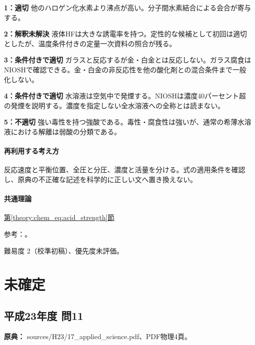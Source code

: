 \noindent\textbf{1：適切} 他のハロゲン化水素より沸点が高い。分子間水素結合による会合が寄与する。\par

\noindent\textbf{2：解釈未解決} 液体HFは大きな誘電率を持つ。定性的な候補として初回は適切としたが、温度条件付きの定量一次資料の照合が残る。\par

\noindent\textbf{3：条件付きで適切} ガラスと反応するが金・白金とは反応しない。ガラス腐食はNIOSHで確認できる。金・白金の非反応性を他の酸化剤との混合条件まで一般化しない。\par

\noindent\textbf{4：条件付きで適切} 水溶液は空気中で発煙する。NIOSHは濃度40パーセント超の発煙を説明する。濃度を指定しない全水溶液への全称とは読まない。\par

\noindent\textbf{5：不適切} 強い毒性を持つ強酸である。毒性・腐食性は強いが、通常の希薄水溶液における解離は弱酸の分類である。\par

\paragraph{再利用する考え方} 反応速度と平衡位置、全圧と分圧、濃度と活量を分ける。式の適用条件を確認し、原典の不正確な記述を科学的に正しい文へ置き換えない。

\paragraph{共通理論} \hyperref[theory:chem_eq:acid_strength]{第\ref*{theory:chem_eq:acid_strength}節}

\par 参考：\cite{purdue_acid_strength,niosh_hf}。

\par 難易度 2（校準初稿）、優先度未評価。

\section{未確定}

\subsection{平成23年度 問11}
\label{q:h23-reg-applied-11}

\noindent\textbf{原典：} sources/H23/17\_applied\_science.pdf、PDF物理4頁。

